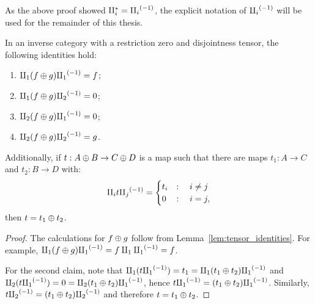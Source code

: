 As the above proof showed $\amalg_{i}^{*} = {\amalg_{i}}^{(-1)}$, the explicit notation of ${\amalg_{i}}^{(-1)}$ will be used for the
remainder of this thesis.

\begin{corollary}\label{cor:split_plus_tensor}
  In an inverse category \X with a restriction zero and disjointness tensor, the following
  identities hold:
  \begin{multicols}{2}
    \begin{enumerate}[{(}i{)}]
      \item $\amalg_{1} (f \oplus g) {\amalg_{1}}^{(-1)} = f$;
      \item $\amalg_{1} (f\oplus g) {\amalg_{2}}^{(-1)} = 0$;
      \item $\amalg_{2} (f \oplus g) {\amalg_{1}}^{(-1)} = 0$;
      \item $\amalg_{2} (f\oplus g) {\amalg_{2}}^{(-1)} = g$.
    \end{enumerate}
  \end{multicols}
  Additionally, if $t:A\oplus B \to C\oplus D$ is a map such that there are maps $t_1:A\to C$ and $t_2:B\to D$
  with:
  \[
    \amalg_{i} t {\amalg_{j}}^{(-1)} =
    \begin{cases}
      t_i& : \quad i \neq j\\
      0 & : \quad i = j,
    \end{cases}
  \]
  then $t = t_1 \oplus t_2$.
\end{corollary}
\begin{proof}
  The calculations for $f\oplus g$ follow from
  Lemma~\ref{lem:tensor_identities}. For example, $\amalg_{1} (f\oplus g) {\amalg_{1}}^{(-1)} = f \amalg_{1} {\amalg_{1}}^{(-1)} = f$.

  For the second claim, note that $\amalg_{1} (t {\amalg_{1}}^{(-1)}) = t_1 = \amalg_{1} ( t_1 \oplus t_2){\amalg_{1}}^{(-1)}$ and
  $\amalg_{2}  (t {\amalg_{1}}^{(-1)}) = 0 = \amalg_{2} ( t_1 \oplus t_2){\amalg_{1}}^{(-1)}$, hence $t {\amalg_{1}}^{(-1)} = ( t_1 \oplus t_2){\amalg_{1}}^{(-1)}$. Similarly,
  $t{\amalg_{2}}^{(-1)} = ( t_1 \oplus t_2){\amalg_{2}}^{(-1)}$ and therefore $t = t_1 \oplus t_2$.
\end{proof}

